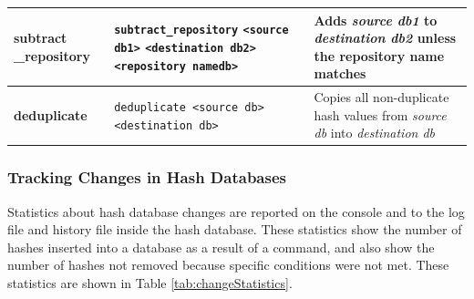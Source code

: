\documentclass[11pt,fleqn]{article} %
\begin{document}
\begin{table}[!ht]
\begin{tabular}{|p{3.5 cm}|p{6 cm}|p{4 cm}|}
\hline
\textbf{subtract \_repository} & \verb+subtract_repository+ \verb+<source db1>+ \verb+<destination db2>+ \verb+<repository namedb>+ & Adds \textit{source db1} to \textit{destination db2} unless the repository name matches\\
\hline
\textbf{deduplicate} & \verb+deduplicate <source db>+ \verb+<destination db>+ &   Copies all non-duplicate hash values from \textit{source db} into \textit{destination db}\\
\hline
\end{tabular}
\end{table}

\subsubsection{Tracking Changes in Hash Databases}
Statistics about hash database changes are reported on the console and to the log file and history file inside the hash database.
These statistics show the number of hashes inserted into a database as a result of a command, and also show the number of hashes not removed because specific conditions were not met.
These statistics are shown in Table \ref{tab:changeStatistics}.
\end{document}
